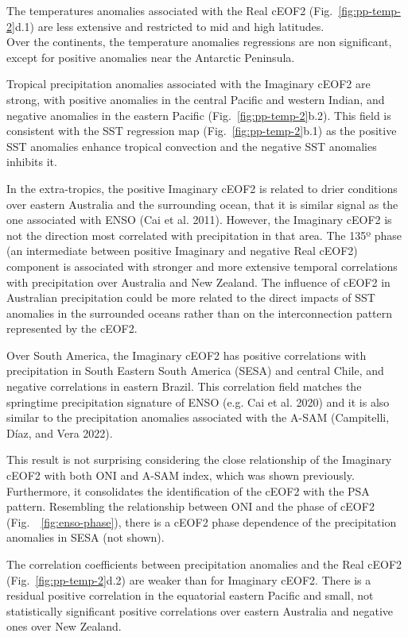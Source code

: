 \documentclass[smallextended]{svjour3}       %
\begin{document}
The temperatures anomalies associated with the Real cEOF2 (Fig.~\ref{fig:pp-temp-2}d.1) are less extensive and restricted to mid and high latitudes.\\
Over the continents, the temperature anomalies regressions are non significant, except for positive anomalies near the Antarctic Peninsula.

Tropical precipitation anomalies associated with the Imaginary cEOF2 are strong, with positive anomalies in the central Pacific and western Indian, and negative anomalies in the eastern Pacific (Fig.~\ref{fig:pp-temp-2}b.2).
This field is consistent with the SST regression map (Fig.~\ref{fig:pp-temp-2}b.1) as the positive SST anomalies enhance tropical convection and the negative SST anomalies inhibits it.

In the extra-tropics, the positive Imaginary cEOF2 is related to drier conditions over eastern Australia and the surrounding ocean, that it is similar signal as the one associated with ENSO (Cai et al. 2011).
However, the Imaginary cEOF2 is not the direction most correlated with precipitation in that area.
The 135º phase (an intermediate between positive Imaginary and negative Real cEOF2) component is associated with stronger and more extensive temporal correlations with precipitation over Australia and New Zealand.
The influence of cEOF2 in Australian precipitation could be more related to the direct impacts of SST anomalies in the surrounded oceans rather than on the interconnection pattern represented by the cEOF2.

Over South America, the Imaginary cEOF2 has positive correlations with precipitation in South Eastern South America (SESA) and central Chile, and negative correlations in eastern Brazil. This correlation field matches the springtime precipitation signature of ENSO (e.g. Cai et al. 2020) and it is also similar to the precipitation anomalies associated with the A-SAM (Campitelli, Díaz, and Vera 2022).

This result is not surprising considering the close relationship of the Imaginary cEOF2 with both ONI and A-SAM index, which was shown previously.\\
Furthermore, it consolidates the identification of the cEOF2 with the PSA pattern. Resembling the relationship between ONI and the phase of cEOF2 (Fig.~~\ref{fig:enso-phase}), there is a cEOF2 phase dependence of the precipitation anomalies in SESA (not shown).

The correlation coefficients between precipitation anomalies and the Real cEOF2 (Fig.~\ref{fig:pp-temp-2}d.2) are weaker than for Imaginary cEOF2.
There is a residual positive correlation in the equatorial eastern Pacific and small, not statistically significant positive correlations over eastern Australia and negative ones over New Zealand.
\end{document}
